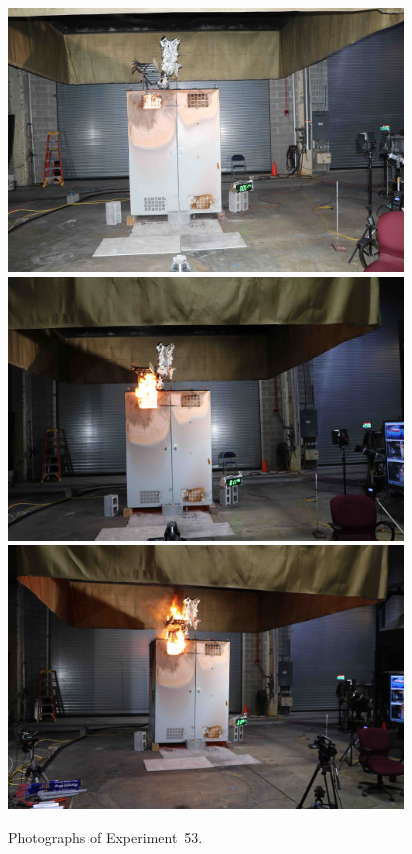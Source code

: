 \begin{figure}[p]
\centering
\includegraphics[height=2.75in]{../FIGURES/Test_53_5_min_24_s} \\
\includegraphics[height=2.75in]{../FIGURES/Test_53_11_min_45_s} \\
\includegraphics[height=2.75in]{../FIGURES/Test_53_ignition}
\caption[Photographs of Experiment~53]{Photographs of Experiment~53.}
\label{fig:Test_53_photos}
\end{figure}


\clearpage

